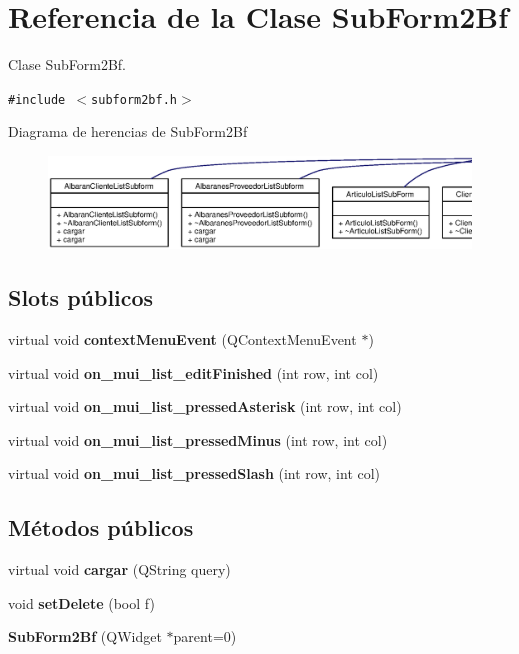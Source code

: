 \section{Referencia de la Clase Sub\-Form2Bf}
\label{classSubForm2Bf}
Clase Sub\-Form2Bf.  


{\tt \#include $<$subform2bf.h$>$}

Diagrama de herencias de Sub\-Form2Bf\begin{figure}[H]
\begin{center}
\leavevmode
\includegraphics[width=420pt]{classSubForm2Bf__inherit__graph}
\end{center}
\end{figure}
\subsection*{Slots p\'{u}blicos}
\begin{CompactItemize}
\item 
virtual void {\bf context\-Menu\-Event} (QContext\-Menu\-Event $\ast$)\label{classSubForm2Bf_i0}

\item 
virtual void {\bf on\_\-mui\_\-list\_\-edit\-Finished} (int row, int col)\label{classSubForm2Bf_i1}

\item 
virtual void {\bf on\_\-mui\_\-list\_\-pressed\-Asterisk} (int row, int col)
\item 
virtual void {\bf on\_\-mui\_\-list\_\-pressed\-Minus} (int row, int col)
\item 
virtual void {\bf on\_\-mui\_\-list\_\-pressed\-Slash} (int row, int col)\label{classSubForm2Bf_i4}

\end{CompactItemize}
\subsection*{M\'{e}todos p\'{u}blicos}
\begin{CompactItemize}
\item 
virtual void {\bf cargar} (QString query)\label{classSubForm2Bf_a0}

\item 
void {\bf set\-Delete} (bool f)\label{classSubForm2Bf_a1}

\item 
{\bf Sub\-Form2Bf} (QWidget $\ast$parent=0)\label{classSubForm2Bf_a2}

\end{CompactItemize}


